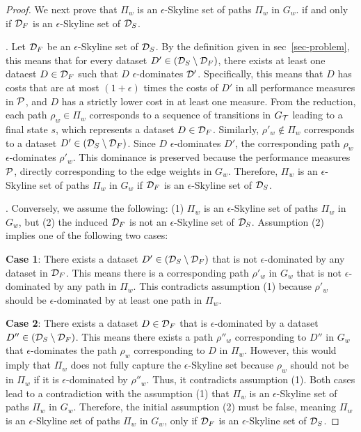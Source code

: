 \begin{proof}
We next prove 
that %
$\Pi_w$ is an $\epsilon$-Skyline set 
of paths $\Pi_w$ in $G_w$. 
if and only 
if $\D_F$ is an $\epsilon$-Skyline set 
of $\D_S$. 

. 
Let $\D_F$ be an $\epsilon$-Skyline set of $\D_S$.  
By the definition given in sec~\ref{sec-problem}, this means that for every dataset $D' \in (\D_S\setminus\D_F)$, there exists at least one dataest $D \in \D_F$ such that $D$ $\epsilon$-dominates $\D'$. 
Specifically, this means that $D$ has costs that are at most $(1+\epsilon)$ times the costs of $D'$ in all performance measures in $\P$, and $D$ has a strictly lower cost in at least one measure.
From the reduction, each path $\rho_w \in \Pi_w$ corresponds to a sequence of transitions in $G_\T$ leading to a final state $s$, which represents a dataset $D \in \D_F$. Similarly, $\rho'_w \notin \Pi_w$ corresponds to a dataset $D' \in (\D_S\setminus\D_F)$. 
Since $D$ $\epsilon$-dominates $D'$, the corresponding path 
$\rho_w$ $\epsilon$-dominates $\rho'_w$. 
This dominance is preserved because the performance measures $\P$, directly corresponding to the edge weights in $G_w$. 
Therefore, $\Pi_w$ is an $\epsilon$-Skyline set 
of paths $\Pi_w$ in $G_w$ if $\D_F$ is an $\epsilon$-Skyline set 
of $\D_S$.

. Conversely, we assume the following:
(1) $\Pi_w$ is an $\epsilon$-Skyline set of paths $\Pi_w$ in $G_w$, but 
(2) the induced $\D_F$ is not an $\epsilon$-Skyline set of $\D_S$. 
Assumption (2) implies one of the following two cases:
\bi
\item \textbf{Case 1}:
There exists a dataset $D' \in (\D_S\setminus\D_F)$ that is not $\epsilon$-dominated by any dataset in $\D_F$. This means there is a corresponding path $\rho'_w$ in $G_w$ that is not $\epsilon$-dominated by any path in $\Pi_w$. This contradicts assumption (1)  because $\rho'_w$ should be $\epsilon$-dominated by at least one path in $\Pi_w$.
\item \textbf{Case 2}: There exists a dataset $D \in \D_F$ that is $\epsilon$-dominated by a dataset $D'' \in (\D_S\setminus\D_F)$. 
This means there exists a path $\rho''_w$ corresponding to $D''$ in $G_w$ that $\epsilon$-dominates the path $\rho_w$ corresponding to $D$ in $\Pi_w$. However, this would imply that $\Pi_w$ does not fully capture the $\epsilon$-Skyline set because $\rho_w$ should not be in $\Pi_w$ if it is $\epsilon$-dominated by $\rho''_w$. Thus, it contradicts assumption (1).
\ei
Both cases lead to a contradiction with the assumption (1) that $\Pi_w$ is an $\epsilon$-Skyline set of paths $\Pi_w$ in $G_w$. Therefore, the initial assumption (2) must be false, meaning $\Pi_w$ is an $\epsilon$-Skyline set 
of paths $\Pi_w$ in $G_w$, only 
if $\D_F$ is an $\epsilon$-Skyline set 
of $\D_S$. 


\end{proof}
